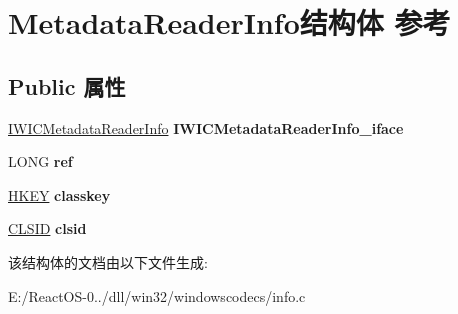 \hypertarget{struct_metadata_reader_info}{}\section{Metadata\+Reader\+Info结构体 参考}
\label{struct_metadata_reader_info}
\subsection*{Public 属性}
\begin{DoxyCompactItemize}
\item 
\mbox{\label{struct_metadata_reader_info_a1a37f0c4e0f1ab9198f7a5a8df4ecc38}} 
\hyperlink{interface_i_w_i_c_metadata_reader_info}{I\+W\+I\+C\+Metadata\+Reader\+Info} {\bfseries I\+W\+I\+C\+Metadata\+Reader\+Info\+\_\+iface}
\item 
\mbox{\label{struct_metadata_reader_info_a9cdf9a6c7f083c301b2a6ed544189cc3}} 
L\+O\+NG {\bfseries ref}
\item 
\mbox{\label{struct_metadata_reader_info_a158745fc162ab4d400a605b71c76dd9d}} 
\hyperlink{interfacevoid}{H\+K\+EY} {\bfseries classkey}
\item 
\mbox{\label{struct_metadata_reader_info_a7593e3ec07d0e0b21e3d708bf5f70fc5}} 
\hyperlink{struct___i_i_d}{C\+L\+S\+ID} {\bfseries clsid}
\end{DoxyCompactItemize}


该结构体的文档由以下文件生成\+:\begin{DoxyCompactItemize}
\item 
E\+:/\+React\+O\+S-\/0../dll/win32/windowscodecs/info.\+c\end{DoxyCompactItemize}
